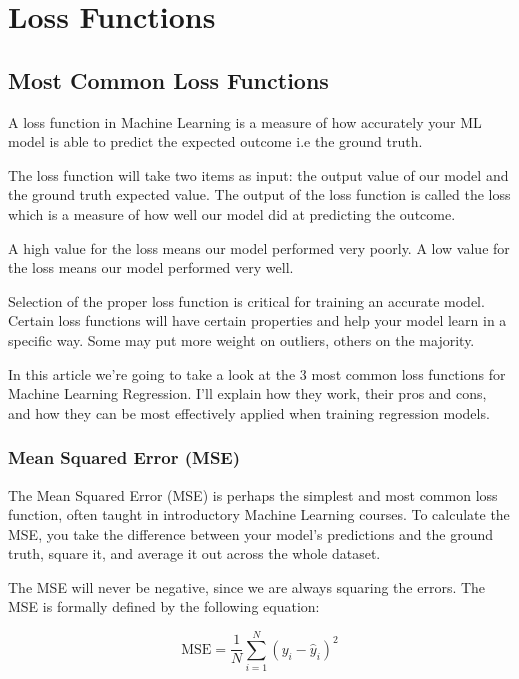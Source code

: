 
\chapter{Loss Functions}
\label{sec:LossFunctions}

\section{Most Common Loss Functions}

\cite{GeorgeSeif2019}

A loss function in Machine Learning is a measure of how accurately your ML model is able to predict the expected outcome i.e the ground truth.

The loss function will take two items as input: the output value of our model and the ground truth expected value. The output of the loss function is called the loss which is a measure of how well our model did at predicting the outcome.

A high value for the loss means our model performed very poorly. A low value for the loss means our model performed very well.

Selection of the proper loss function is critical for training an accurate model. Certain loss functions will have certain properties and help your model learn in a specific way. Some may put more weight on outliers, others on the majority.

In this article we're going to take a look at the 3 most common loss functions for Machine Learning Regression. I'll explain how they work, their pros and cons, and how they can be most effectively applied when training regression models.

\subsection{Mean Squared Error (MSE)}

The Mean Squared Error (MSE) is perhaps the simplest and most common loss function, often taught in introductory Machine Learning courses. To calculate the MSE, you take the difference between your model's predictions and the ground truth, square it, and average it out across the whole dataset.

The MSE will never be negative, since we are always squaring the errors. The MSE is formally defined by the following equation:

\begin{equation}
\mathrm{MSE}=\frac{1}{N} \sum_{i=1}^{N}\left(y_{i}-\hat{y}_{i}\right)^{2}
\end{equation}

